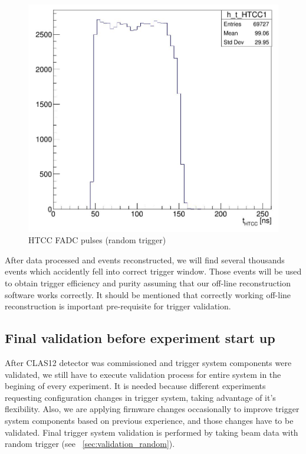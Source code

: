 \begin{figure}[hbt]
	\centering
	\includegraphics[width=1.0\columnwidth,keepaspectratio]{img/htcc_fadc2.png}
	\caption{HTCC FADC pulses (random trigger)}
	\label{fig:htcc_fadc2}
\end{figure}

After data processed and events reconstructed, we will find several thousands events which accidently fell into correct trigger window. Those events will be used to obtain trigger efficiency and purity assuming that our off-line reconstruction software works correctly. It should be mentioned that correctly working off-line reconstruction is important pre-requisite for trigger validation.












\subsection{Final validation before experiment start up}

After CLAS12 detector was commissioned and trigger system components were validated, we still have to execute validation process for entire system in the begining of every experiment. It is needed because different experiments requesting configuration changes in trigger system, taking advantage of it's flexibility. Also, we are applying firmware changes occasionally to improve trigger system components based on previous experience, and those changes have to be validated.
Final trigger system validation is performed by taking beam data with random trigger (see ~\ref{sec:validation_random}).

